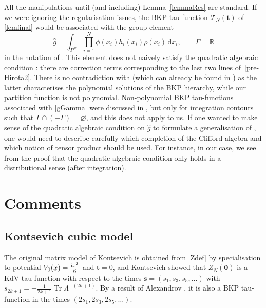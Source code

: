 \documentclass[10pt,a4paper]{amsart}
\numberwithin{equation}{section}
\newcommand{\dd}{\mathrm{d}}
\begin{document}
\begin{Remark} \label{RemarkBKP}

All the manipulations until (and including) Lemma~\ref{lemmaRes} are standard. If we were ignoring the regularisation issues,
the BKP tau-function $\mathcal{T}_N(\mathbf{t})$ of \eqref{lemfinal} would
be associated with the group element
\begin{equation}
\label{gGamma}
\hat{g} = \int_{\Gamma^N} \prod_{i = 1}^{N} \phi(x_i) h_i(x_i)\rho(x_i)\,\dd x_i,
\qquad \Gamma = \mathbb{R}
\end{equation}
in the notation of \cite[Section 7.3]{harnad_balogh_2021}. This element
does not naively satisfy the quadratic algebraic condition
\cite[equation 7.3.63]{harnad_balogh_2021}:
there are correction terms corresponding to the last two lines of~\eqref{pre-Hirota2}. There is no contradiction
with \cite[Theorem 7.3.10]{harnad_balogh_2021} (which can already be
found in \cite{Date:1981qz}) as the latter characterises the
polynomial solutions of the BKP hierarchy, while our partition
function is not polynomial. Non-polynomial BKP tau-functions
associated with \eqref{gGamma} were discussed in
\cite{harnad_balogh_2021}, but only for integration contours such that
$\Gamma \cap (-\Gamma) = \varnothing$, and this does not apply to us. If
one wanted to make sense of the quadratic algebraic condition on $\hat{g}$
to formulate a generalisation of \cite[Theorem
7.3.10]{harnad_balogh_2021}, one would need to describe carefully
which completion of the Clifford algebra and which notion of tensor
product should be used. For instance, in our case, we see from the
proof that the quadratic algebraic condition only holds in a
distributional sense (after integration).
\end{Remark}

\section{Comments}\label{section4}

\subsection{Kontsevich cubic model} The original matrix model of Kontsevich \cite{Kontsevich:1992ti} is obtained from \eqref{Zdef} by specialisation to potential $V_0(x) = \frac{{\rm i}x^3}{6}$ and $\mathbf{t} = 0$, and Kontsevich showed that $Z_N(\mathbf{0})$ is a KdV tau-function with respect to the times $\mathbf{s} = (s_1,s_3,s_5,\dots)$ with $s_{2k + 1} = - \frac{1}{2k + 1} \operatorname{Tr}\Lambda^{-(2k +1)}$. By a result of Alexandrov
\cite{Alexandrov:2020nzt}, it is also a BKP tau-function in the times $(2s_1,2s_3,2s_5,\dots)$.
\end{document}
